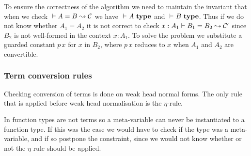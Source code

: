 To ensure the correctness of the algorithm we need to maintain the invariant
that when we check ${} \vdash {A} = {B} \leadsto {\mathcal{C}}$ we have ${} \vdash_{}A ~ \mathbf{type}$ and
${} \vdash_{}B ~ \mathbf{type}$. Thus if we do not know whether $A_1 = A_2$ it is not
correct to check ${x : A_1} \vdash {B_1} = {B_2} \leadsto {\mathcal{C}^\prime}$
since $B_2$ is not well-formed in the context $x : A_1$. To solve the problem
we substitute a guarded constant $p \, x$ for $x$ in $B_2$, where $p \, x$
reduces to $x$ when $A_1$ and $A_2$ are convertible.

% 
% 
% 
% 
% 

\subsubsection{Term conversion rules}

Checking conversion of terms is done on weak head normal forms. The only rule
that is applied before weak head normalisation is the $\eta$-rule.


In {\Core} function types are not terms so a meta-variable can never be
instantiated to a function type. If this was the case we would have to check if
the type was a meta-variable, and if so postpone the constraint, since we would
not know whether or not the $\eta$-rule should be applied.

